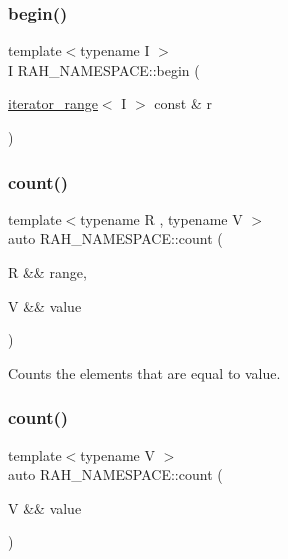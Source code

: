 \subsubsection{\texorpdfstring{begin()}{begin()}\hspace{0.1cm}{\footnotesize\ttfamily [2/2]}}
{\footnotesize\ttfamily template$<$typename I $>$ \\
I R\+A\+H\+\_\+\+N\+A\+M\+E\+S\+P\+A\+C\+E\+::begin (\begin{DoxyParamCaption}\item[{\mbox{\hyperlink{struct_r_a_h___n_a_m_e_s_p_a_c_e_1_1iterator__range}{iterator\+\_\+range}}$<$ I $>$ const \&}]{r }\end{DoxyParamCaption})}

\mbox{\label{namespace_r_a_h___n_a_m_e_s_p_a_c_e_a7c7b2627a4cd1c0877ea39d0b1bae608}} 
\subsubsection{\texorpdfstring{count()}{count()}\hspace{0.1cm}{\footnotesize\ttfamily [1/2]}}
{\footnotesize\ttfamily template$<$typename R , typename V $>$ \\
auto R\+A\+H\+\_\+\+N\+A\+M\+E\+S\+P\+A\+C\+E\+::count (\begin{DoxyParamCaption}\item[{R \&\&}]{range,  }\item[{V \&\&}]{value }\end{DoxyParamCaption})}



Counts the elements that are equal to value. 


\begin{DoxyCodeInclude}{0}
\end{DoxyCodeInclude}
\mbox{\label{namespace_r_a_h___n_a_m_e_s_p_a_c_e_ae85f193e93d3512d1cb2d62fbbe02d8c}} 
\subsubsection{\texorpdfstring{count()}{count()}\hspace{0.1cm}{\footnotesize\ttfamily [2/2]}}
{\footnotesize\ttfamily template$<$typename V $>$ \\
auto R\+A\+H\+\_\+\+N\+A\+M\+E\+S\+P\+A\+C\+E\+::count (\begin{DoxyParamCaption}\item[{V \&\&}]{value }\end{DoxyParamCaption})}



